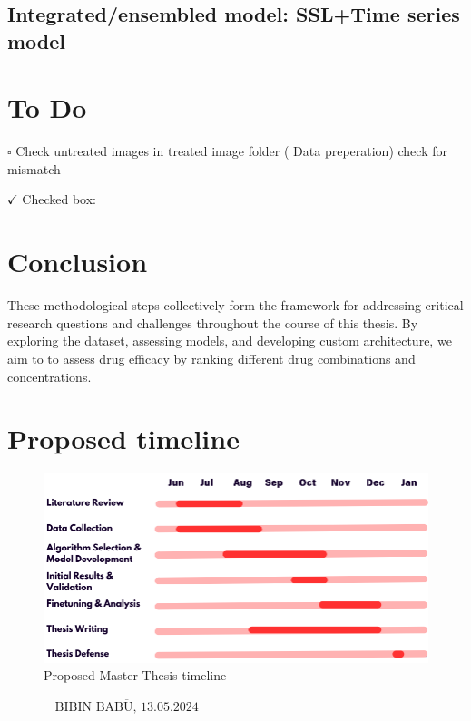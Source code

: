 \documentclass[12pt,twoside,a4paper,parskip]{scrbook} %
\def\BaAuthor{Bibin Babu}
\def\SubmitDate{13.05.2024}
\def\ShowBaAuthor{\BaAuthor}
\def\ShowBaAuthor{BIBIN BABU}
\begin{document}
\section{Integrated/ensembled model: SSL+Time series model}

\chapter{To Do}\label{ch:To Do}
$\square$ Check untreated images in treated image folder ( Data preperation) check for mismatch 

$\checkmark$ Checked box: 
\chapter{Conclusion}\label{ch:Conclusion}

These methodological steps collectively form the framework for addressing critical research questions and challenges throughout the course of this thesis. By exploring the dataset, assessing models, and developing custom architecture, we aim to to assess drug efficacy by ranking different drug combinations and concentrations.

\let\cleardoublepage\clearpage

\chapter{Proposed timeline}\label{ch:Proposed timeline}

\begin{figure}[H]
    \centering
    \includegraphics[width=0.9\linewidth]{figures/Thesis timeline.png} %
    \caption{Proposed Master Thesis timeline}
    \label{fig:enter-label}
\end{figure}

\FloatBarrier

\printbibliography

\vspace{20pt}
\begin{flushright}
$\overline{~~~~~~~~~~~~~~~~~\mbox{\ShowBaAuthor, \SubmitDate}~~~~~~~~~~~~~~~~~}$
\end{flushright}
\end{document}
